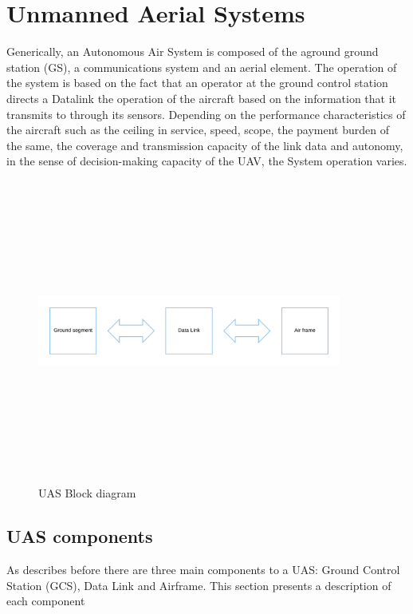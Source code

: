 \section{Unmanned Aerial Systems}
Generically, an Autonomous Air System is composed of the aground ground station (GS), a communications system and an aerial element. The operation of the system is based on the fact that an operator at the ground control station directs a Datalink the operation of the aircraft based on the information that it transmits to through its sensors. Depending on the performance characteristics of the aircraft such as the ceiling in service, speed, scope, the payment burden of the same, the coverage and transmission capacity of the link data and autonomy, in the sense of decision-making capacity of the UAV, the System operation varies.\cite{Duran}
\begin{figure}[H]
\centering
\includegraphics[width=10cm,height=10cm,keepaspectratio]{imagenes/UAS_Components.png}
\caption{UAS Block diagram}
\label{fig:block diagram}
\end{figure}

\subsection{UAS components}
As describes before there are three main components to a UAS: Ground Control Station (GCS), Data Link and Airframe. This section presents a description of each component 
